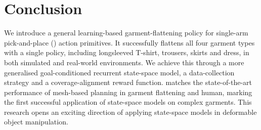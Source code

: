 \documentclass[journal]{IEEEtran}
\begin{document}

\section{Conclusion} \label{sec:conclusion}

We introduce a general learning-based garment-flattening policy  for single-arm pick-and-place () action primitives. It successfully flattens all four garment types with a single policy, including longsleeved T-shirt, trousers, skirts and dress, in both simulated and real-world environments. We achieve this through a more generalised goal-conditioned recurrent state-space model, a data-collection strategy and a coverage-alignment reward function.  matches the state-of-the-art performance of mesh-based planning in garment flattening and human, marking the first successful application of state-space models on complex garments. This research opens an exciting direction of applying state-space models in deformable object manipulation. 
\end{document}
